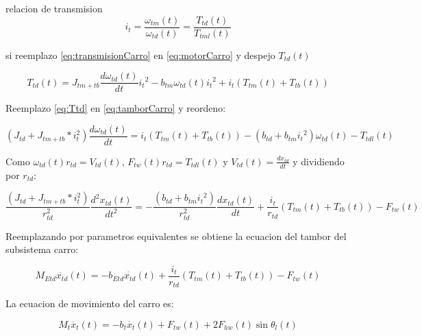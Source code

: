 \documentclass{article}
\begin{document}
            relacion de transmision
            \begin{equation} \label{eq:transmisionCarro}
                i_t = \frac{\omega_{tm}(t)}{\omega_{td}(t)} = \frac{T_{td}(t)}{T_{tml}(t)}
            \end{equation}

            si reemplazo \ref{eq:transmisionCarro} en \ref{eq:motorCarro} y despejo $T_{td}(t)$

            \begin{equation} \label{eq:Ttd}
                T_{td}(t) = J_{tm+tb} \frac{d \omega_{td}(t)}{dt} {i_t}^2 - b_{tm} \omega_{td}(t) {i_t}^2 + i_t (T_{tm}(t) + T_{tb}(t))
            \end{equation}

            Reemplazo \ref{eq:Ttd} en \ref{eq:tamborCarro} y reordeno:

            \begin{equation} \label{eq:carroTtdl}
                (J_{td} + J_{tm+tb}*i_t^2) \frac{d \omega_{td}(t)}{dt} = i_t (T_{tm}(t) + T_{tb}(t)) - (b_{td} + b_{tm}{i_t}^2) \omega_{td}(t) - T_{tdl}(t)
            \end{equation}
        
            Como $\omega_{td}(t) r_{td} = V_{td}(t)$, $F_{tw}(t)r_{td} = T_{tdl}(t)$ y $V_{td}(t) = \frac{d x_{td}}{dt}$ y dividiendo por $r_{td}$:
            
            \begin{equation} \label{eq:carroFtw}
                \frac{(J_{td} + J_{tm+tb}*i_t^2)}{r_{td}^2} \frac{d^2 x_{td}(t)}{dt^2} = - \frac{(b_{td} + b_{tm}{i_t}^2)}{r_{td}^2} \frac{d x_{td}(t)}{dt} + \frac{i_t}{r_{td}} (T_{tm}(t) + T_{tb}(t)) - F_{tw}(t)
            \end{equation}

            Reemplazando por parametros equivalentes se obtiene la ecuacion del tambor del subsistema carro:

            \begin{equation} \label{eq:TamborCarro}
                M_{Etd} \ddot{x_{td}}(t) = - b_{Etd} \dot{x_{td}}(t) + \frac{i_t}{r_{td}} (T_{tm}(t) + T_{tb}(t)) - F_{tw}(t)
            \end{equation}

            La ecuacion de movimiento del carro es:

            \begin{equation} \label{eq:Carro}
                M_t \ddot{x_{t}}(t) = - b_t \dot{x_{t}}(t) + F_{tw}(t) + 2F_{hw}(t)\sin{\theta_l(t)}
            \end{equation}
\end{document}
